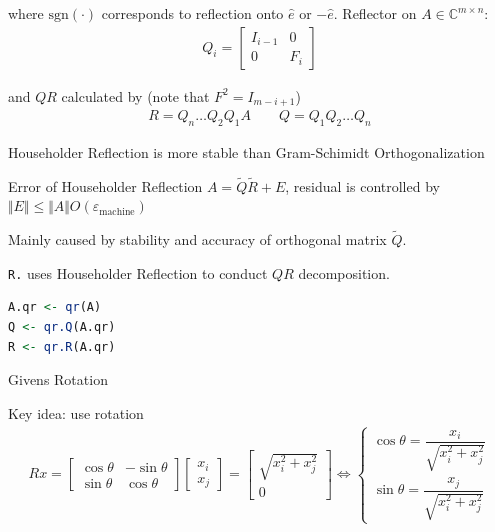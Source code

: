     where $ \mathrm{sgn}(\cdot) $ corresponds to reflection onto $ \hat{e} $ or $ -\hat{e} $.   
    Reflector on $ A\in\mathbb{C}^{m\times n} $:
    \begin{align}
        Q_i=\begin{bmatrix}
            I_{i-1}&0\\
            0&F_i
        \end{bmatrix} 
    \end{align}
    
    and $ QR $ calculated by (note that $ F^2=I_{m-i+1} $)
    \begin{align}
        R=Q_n\ldots Q_2Q_1A\qquad Q=Q_1Q_2\ldots Q_n
    \end{align}
    
    

    Householder Reflection is more stable than Gram-Schimidt Orthogonalization


    
    
    Error of Householder Reflection $ A=\tilde{Q}\tilde{R}+E $, residual is controlled by $ \Vert E \Vert \leq \Vert A \Vert O(\varepsilon _\mathrm{machine}) $

    Mainly caused by stability and accuracy of orthogonal matrix $ \tilde{Q} $.


\begin{rcode}
\lstinline|R.| uses Householder Reflection to conduct $ QR $ decomposition.
\begin{lstlisting}[language=R]
A.qr <- qr(A)
Q <- qr.Q(A.qr)
R <- qr.R(A.qr)
\end{lstlisting}
\end{rcode}

\begin{point}
    \hypertarget{Givens-Rotation}{Givens Rotation}
\end{point}
    
    Key idea: use rotation
    \begin{align}
        Rx=\begin{bmatrix}
            \cos\theta &-\sin\theta \\
            \sin\theta &\cos\theta 
        \end{bmatrix} \begin{bmatrix}
            x_i\\x_j
        \end{bmatrix}=\begin{bmatrix}
            \sqrt{x_i^2+x_j^2}\\0
        \end{bmatrix}
        \Leftrightarrow \begin{cases}
            \cos\theta =\dfrac{x_i}{\sqrt{x_i^2+x_j^2}}\\
            \sin\theta =\dfrac{x_j}{\sqrt{x_i^2+x_j^2}}
        \end{cases}
    \end{align}
    
